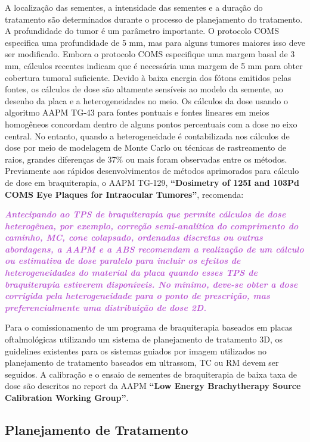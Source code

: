 \documentclass[11pt,a4paper]{article}
\newcounter{exemplo}
\begin{document}
    A localização das sementes, a intensidade das sementes e a duração do tratamento são determinados durante o processo de planejamento do tratamento. A profundidade do tumor é um parâmetro importante. O protocolo COMS especifica uma profundidade de 5 mm, mas para alguns tumores maiores isso deve ser modificado. Embora o protocolo COMS especifique uma margem basal de 3 mm, cálculos recentes indicam que é necessária uma margem de 5 mm para obter cobertura tumoral suficiente. Devido à baixa energia dos fótons emitidos pelas fontes, os cálculos de dose são altamente sensíveis ao modelo da semente, ao desenho da placa e a heterogeneidades no meio. Os cálculos da dose usando o algoritmo AAPM TG-43 para fontes pontuais e fontes lineares em meios homogêneos concordam dentro de alguns pontos percentuais com a dose no eixo central. No entanto, quando a heterogeneidade é contabilizada nos cálculos de dose por meio de modelagem de Monte Carlo ou técnicas de rastreamento de raios, grandes diferenças de 37\% ou mais foram observadas entre os métodos. Previamente aos rápidos desenvolvimentos de métodos aprimorados para cálculo de dose em braquiterapia, o AAPM TG-129, \textbf{``Dosimetry of 125I and 103Pd COMS Eye Plaques for Intraocular Tumores''}, recomenda:

    \textit{\textbf{\textcolor{MediumOrchid}{Antecipando ao TPS de braquiterapia que permite cálculos de dose heterogênea, por exemplo, correção semi-analítica do comprimento do caminho, MC, cone colapsado, ordenadas discretas ou outras abordagens, a AAPM e a ABS recomendam a realização de um cálculo ou estimativa de dose paralelo para incluir os efeitos de heterogeneidades do material da placa quando esses TPS de braquiterapia estiverem disponíveis. No mínimo, deve-se obter a dose corrigida pela heterogeneidade para o ponto de prescrição, mas preferencialmente uma distribuição de dose 2D.}}}

    Para o comissionamento de um programa de braquiterapia baseados em placas oftalmológicas utilizando um sistema de planejamento de tratamento 3D, os guidelines existentes para os sistemas guiados por imagem utilizados no planejamento de tratamento baseados em ultrassom, TC ou RM devem ser seguidos. A calibração e o ensaio de sementes de braquiterapia de baixa taxa de dose são descritos no report da AAPM \textbf{``Low Energy Brachytherapy Source Calibration Working Group''}.

\subsection*{Planejamento de Tratamento} 
\end{document}
